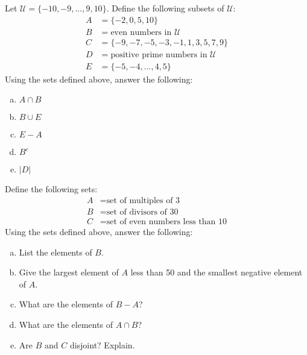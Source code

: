 \documentclass[11pt,letterpaper]{article}
\begin{document}

 Let $\mathcal{U}= \{ -10, -9, \ldots, 9, 10 \}$. Define the following subsets of $\mathcal{U}$:
	\[
	\begin{aligned}
	A&= \{ -2, 0, 5, 10 \} \\
	B&= \text{even numbers in } \mathcal{U} \\
	C&= \{ -9, -7, -5, -3, -1, 1, 3, 5, 7, 9 \} \\
	D&= \text{positive prime numbers in } \mathcal{U} \\
	E&= \{ -5, -4, \ldots, 4, 5 \} 
	\end{aligned}
	\]
Using the sets defined above, answer the following: 
        \begin{enumerate}[(a)]
        \item $A \cap B$
        \item $B \cup E$
        \item $E - A$
        \item $B^c$
        \item $|D|$
        \end{enumerate}



\newpage



 Define the following sets:
	\[
	\begin{aligned}
	A&= \text{set of multiples of 3} \\
	B&= \text{set of divisors of 30} \\
	C&= \text{set of even numbers less than 10} 
	\end{aligned}
	\]
Using the sets defined above, answer the following:
        \begin{enumerate}[(a)]
        \item List the elements of $B$.
        \item Give the largest element of $A$ less than 50 and the smallest negative element of $A$.
        \item What are the elements of $B - A$?
        \item What are the elements of $A \cap B$?
        \item Are $B$ and $C$ disjoint? Explain. 
        \end{enumerate}



\newpage
\end{document}
